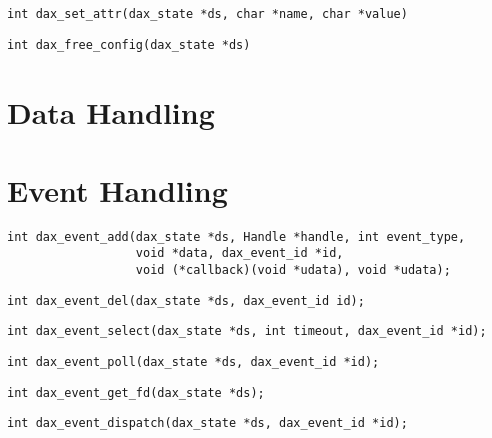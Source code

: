 \begin{verbatim}
int dax_set_attr(dax_state *ds, char *name, char *value)
\end{verbatim}

\begin{verbatim}
int dax_free_config(dax_state *ds)
\end{verbatim}

\section{Data Handling}


\section{Event Handling}
\begin{verbatim}
int dax_event_add(dax_state *ds, Handle *handle, int event_type,
                  void *data, dax_event_id *id, 
                  void (*callback)(void *udata), void *udata);
\end{verbatim}

\begin{verbatim}
int dax_event_del(dax_state *ds, dax_event_id id);
\end{verbatim}

\begin{verbatim}
int dax_event_select(dax_state *ds, int timeout, dax_event_id *id);
\end{verbatim}

\begin{verbatim}
int dax_event_poll(dax_state *ds, dax_event_id *id);
\end{verbatim}

\begin{verbatim}
int dax_event_get_fd(dax_state *ds);
\end{verbatim}

\begin{verbatim}
int dax_event_dispatch(dax_state *ds, dax_event_id *id);
\end{verbatim}
